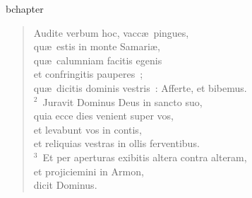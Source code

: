 bchapter\begin{verse}\vspace{-19pt}Audite verbum hoc, vacc\ae\ pingues,\\ qu\ae\ estis in monte Samari\ae ,\\ qu\ae\ calumniam facitis egenis\\ et confringitis pauperes~;\\ qu\ae\ dicitis dominis vestris~: Afferte, et bibemus.\\
${}^{2}$~Juravit Dominus Deus in sancto suo,\\ quia ecce dies venient super vos,\\ et levabunt vos in contis,\\ et reliquias vestras in ollis ferventibus.\\
${}^{3}$~Et per aperturas exibitis altera contra alteram,\\ et projiciemini in Armon,\\ dicit Dominus.\end{verse}


